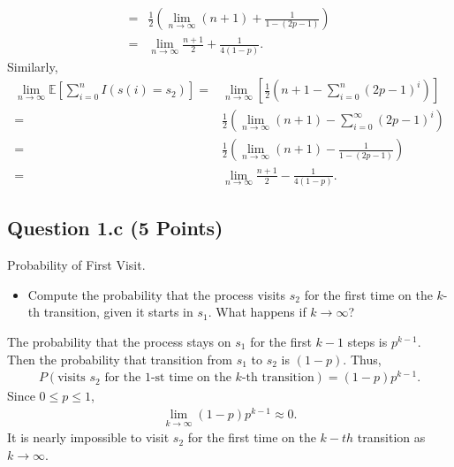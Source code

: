 \documentclass[12pt]{article}
\begin{document}
\begin{solution}
\begin{align}
    = & \frac{1}{2}\left(\lim_{n\rightarrow \infty}(n + 1) + \frac{1}{1-(2p-1)}\right) \\
    = & \lim_{n\rightarrow \infty}\frac{n+1}{2} + \frac{1}{4(1-p)}.
\end{align}
Similarly, 
\begin{align}
    \lim_{n\rightarrow \infty}\mathbb{E}[\sum_{i=0}^{n}I(s(i)=s_2)] 
    = & \lim_{n\rightarrow \infty} \left[ \frac{1}{2}\left(n + 1 - \sum_{i=0}^{n}(2p - 1)^{i}\right) \right] \\
    = & \frac{1}{2}\left(\lim_{n\rightarrow \infty}(n + 1) - \sum_{i=0}^{\infty}(2p - 1)^{i}\right) \\
    = & \frac{1}{2}\left(\lim_{n\rightarrow \infty}(n + 1) - \frac{1}{1-(2p-1)}\right) \\
    = & \lim_{n\rightarrow \infty}\frac{n+1}{2} - \frac{1}{4(1-p)}.
\end{align}
\end{solution}

\subsection*{Question 1.c (5 Points)} Probability of First Visit.
    \begin{itemize}
        \item Compute the probability that the process visits $s_2$ for the first time on the 
$k$-th transition, given it starts in $s_1$. What happens if $k \to \infty$?
    \end{itemize}
\begin{solution}
The probability that the process stays on $s_1$ for the first $k-1$ steps is $p^{k-1}$. Then the probability that transition from $s_1$ to $s_2$ is $(1-p)$. Thus,
\begin{align}
    P(\text{visits $s_2$ for the 1-st time on the 
$k$-th transition}) = (1-p)p^{k-1}.
\end{align}
Since $0 \leq p \leq 1$, 
\begin{align}
    \lim_{k\rightarrow \infty}(1-p)p^{k-1} \approx 0.
\end{align}
It is nearly impossible to visit $s_2$ for the first time on the $k-th$ transition as $k \rightarrow \infty$.
\end{solution}
\end{document}
